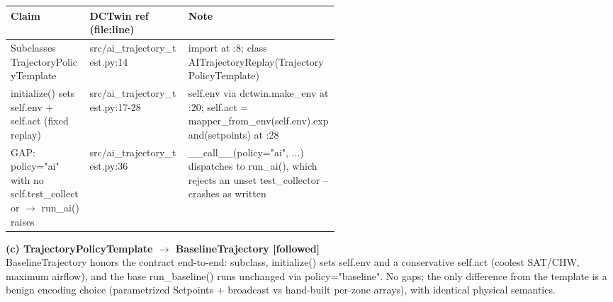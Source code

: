 \documentclass[10pt]{article}
\begin{document}
\vspace{1pt}\begin{tabularx}{\linewidth}{@{}p{0.24\linewidth} p{0.30\linewidth} X@{}}
\toprule
\textbf{Claim} & \textbf{DCTwin ref (file:line)} & \textbf{Note} \\
\midrule
Subclasses TrajectoryPolicyTemplate & src/\allowbreak{}ai\_\allowbreak{}trajectory\_\allowbreak{}test.py:14 & import at :8; class AITrajectoryReplay(TrajectoryPolicyTemplate) \\
initialize() sets self.env + self.act (fixed replay) & src/\allowbreak{}ai\_\allowbreak{}trajectory\_\allowbreak{}test.py:17-28 & self.env via dctwin.make\_\allowbreak{}env at :20; self.act = mapper\_\allowbreak{}from\_\allowbreak{}env(self.env).expand(setpoints) at :28 \\
GAP: policy="ai" with no self.test\_\allowbreak{}collector $\rightarrow$ run\_\allowbreak{}ai() raises & src/\allowbreak{}ai\_\allowbreak{}trajectory\_\allowbreak{}test.py:36 & \_\allowbreak{}\_\allowbreak{}call\_\allowbreak{}\_\allowbreak{}(policy="ai", ...) dispatches to run\_\allowbreak{}ai(), which rejects an unset test\_\allowbreak{}collector -- crashes as written \\
\bottomrule
\end{tabularx}\vspace{2pt}
\smallskip\noindent\textbf{(c) TrajectoryPolicyTemplate $\rightarrow$ BaselineTrajectory [followed]}\\[1pt]
BaselineTrajectory honors the contract end-to-end: subclass, initialize() sets self.env and a conservative self.act (coolest SAT/\allowbreak{}CHW, maximum airflow), and the base run\_\allowbreak{}baseline() runs unchanged via policy="baseline". No gaps; the only difference from the template is a benign encoding choice (parametrized Setpoints + broadcast vs hand-built per-zone arrays), with identical physical semantics.
\end{document}
